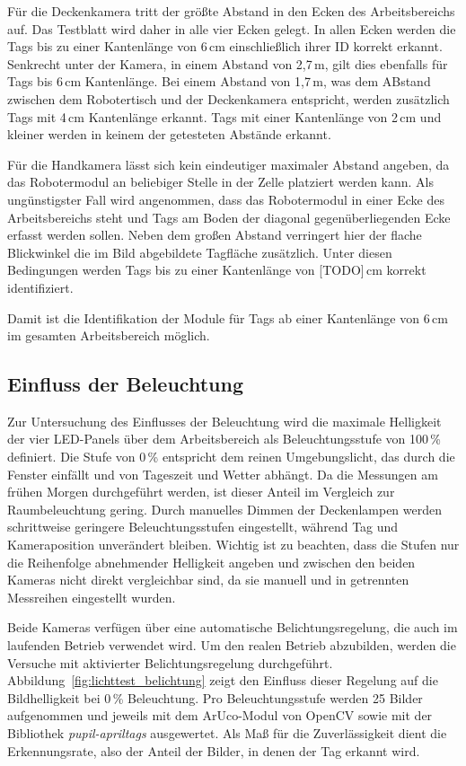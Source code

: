 Für die Deckenkamera tritt der größte Abstand in den Ecken des Arbeitsbereichs auf. Das Testblatt wird daher in alle vier Ecken gelegt. In allen Ecken werden die Tags bis zu einer Kantenlänge von 6\,cm einschließlich ihrer ID korrekt erkannt. Senkrecht unter der Kamera, in einem Abstand von 2,7\,m, gilt dies ebenfalls für Tags bis 6\,cm Kantenlänge. Bei einem Abstand von 1,7\,m, was dem ABstand zwischen dem Robotertisch und der Deckenkamera entspricht, werden zusätzlich Tags mit 4\,cm Kantenlänge erkannt. Tags mit einer Kantenlänge von 2\,cm und kleiner werden in keinem der getesteten Abstände erkannt.

Für die Handkamera lässt sich kein eindeutiger maximaler Abstand angeben, da das Robotermodul an beliebiger Stelle in der Zelle platziert werden kann. Als ungünstigster Fall wird angenommen, dass das Robotermodul in einer Ecke des Arbeitsbereichs steht und Tags am Boden der diagonal gegenüberliegenden Ecke erfasst werden sollen. Neben dem großen Abstand verringert hier der flache Blickwinkel die im Bild abgebildete Tagfläche zusätzlich. Unter diesen Bedingungen werden Tags bis zu einer Kantenlänge von [TODO]\,cm korrekt identifiziert.

Damit ist die Identifikation der Module für Tags ab einer Kantenlänge von 6\,cm im gesamten Arbeitsbereich möglich.

\subsection{Einfluss der Beleuchtung}

Zur Untersuchung des Einflusses der Beleuchtung wird die maximale Helligkeit der vier LED-Panels über dem Arbeitsbereich als Beleuchtungsstufe von 100\,\% definiert. Die Stufe von 0\,\% entspricht dem reinen Umgebungslicht, das durch die Fenster einfällt und von Tageszeit und Wetter abhängt. Da die Messungen am frühen Morgen durchgeführt werden, ist dieser Anteil im Vergleich zur Raumbeleuchtung gering. Durch manuelles Dimmen der Deckenlampen werden schrittweise geringere Beleuchtungsstufen eingestellt, während Tag und Kameraposition unverändert bleiben. Wichtig ist zu beachten, dass die Stufen nur die Reihenfolge abnehmender Helligkeit angeben und zwischen den beiden Kameras nicht direkt vergleichbar sind, da sie manuell und in getrennten Messreihen eingestellt wurden.

Beide Kameras verfügen über eine automatische Belichtungsregelung, die auch im laufenden Betrieb verwendet wird. Um den realen Betrieb abzubilden, werden die Versuche mit aktivierter Belichtungsregelung durchgeführt. Abbildung~\ref{fig:lichttest_belichtung} zeigt den Einfluss dieser Regelung auf die Bildhelligkeit bei 0\,\% Beleuchtung. Pro Beleuchtungsstufe werden 25 Bilder aufgenommen und jeweils mit dem ArUco-Modul von OpenCV sowie mit der Bibliothek \textit{pupil-apriltags} ausgewertet. Als Maß für die Zuverlässigkeit dient die Erkennungsrate, also der Anteil der Bilder, in denen der Tag erkannt wird.


